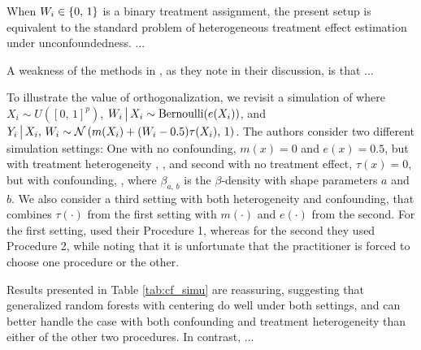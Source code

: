 \documentclass[aos]{imsart}
\theoremstyle{plain}
\theoremstyle{definition}
\theoremstyle{remark}
\begin{document}
\begin{CJK}{UTF8}{gbsn}
When $W_i \in \left\{0, \, 1\right\}$ is a binary treatment assignment,
the present setup is equivalent to the standard problem of heterogeneous
treatment effect estimation under unconfoundedness. ...


A weakness of the methods in \citet{wager2015estimation}, as they note in their discussion, is that ...

To illustrate the value of orthogonalization, we revisit a simulation of
\citet{wager2015estimation} where $X_i \sim U([0, \, 1]^p)$,
$W_i \,\big|\, X_i \sim \text{Bernoulli}(e(X_i))$, and
$Y_i \,\big|\, X_i, \, W_i \sim \mathcal{N}\left(m(X_i) + (W_i - 0.5) \tau(X_i), \, 1\right)$. The authors
consider two different simulation settings: One with no confounding,
$m(x) = 0$ and $e(x) = 0.5$, but with treatment heterogeneity
, ,
and second with no treatment effect, $\tau(x) = 0$, but with confounding,
,
where $\beta_{a, \, b}$ is the $\beta$-density with shape parameters $a$ and $b$.
We also consider a third setting with both heterogeneity and confounding, that combines
$\tau(\cdot)$ from the first setting with $m(\cdot)$ and $e(\cdot)$ from the second.
For the first setting, \citet{wager2015estimation} used their Procedure 1, whereas for the
second they used Procedure 2, while noting that it is unfortunate that the practitioner
is forced to choose one procedure or the other.

Results presented in Table \ref{tab:cf_simu} are reassuring, suggesting that
generalized random forests with centering do well under both settings, and
can better handle the case with both confounding and treatment heterogeneity than
either of the other two procedures. In contrast, ...



\end{CJK}
\end{document}
